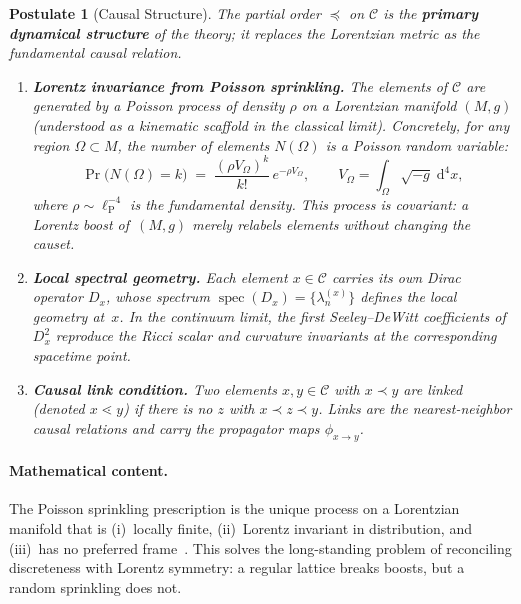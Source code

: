 \documentclass[12pt,a4paper]{article}
\theoremstyle{postulate}
\newtheorem{postulate}{Postulate}
\newcommand{\spec}{\operatorname{spec}}
\newcommand{\Dirac}{D}
\newcommand{\Causal}{\mathcal{C}}
\newcommand{\planck}{\ell_{\mathrm{P}}}
\newcommand{\dd}{\mathrm{d}}
\begin{document}
\begin{postulate}[Causal Structure]\label{post:causality}
The partial order $\preceq$ on $\Causal$ is the \textbf{primary dynamical
structure} of the theory; it replaces the Lorentzian metric as the
fundamental causal relation.

\begin{enumerate}[label=(\alph*)]
  \item \textbf{Lorentz invariance from Poisson sprinkling.}\quad
        The elements of $\Causal$ are generated by a Poisson process of
        density $\rho$ on a Lorentzian manifold $(M, g)$ (understood as
        a kinematic scaffold in the classical limit).  Concretely, for any
        region $\Omega \subset M$, the number of elements $N(\Omega)$ is a
        Poisson random variable:
        \begin{equation}\label{eq:poisson}
          \Pr\bigl(N(\Omega) = k\bigr)
          \;=\; \frac{(\rho V_\Omega)^k}{k!}\,e^{-\rho V_\Omega},
          \qquad
          V_\Omega = \int_\Omega \sqrt{-g}\;\dd^4 x,
        \end{equation}
        where $\rho \sim \planck^{-4}$ is the fundamental density.  This
        process is covariant: a Lorentz boost of~$(M,g)$ merely relabels
        elements without changing the causet.

  \item \textbf{Local spectral geometry.}\quad
        Each element $x \in \Causal$ carries its own Dirac operator
        $\Dirac_x$, whose spectrum $\spec(\Dirac_x) = \{\lambda_n^{(x)}\}$
        defines the local geometry at~$x$.  In the continuum limit, the first
        Seeley--DeWitt coefficients of $\Dirac_x^2$ reproduce the Ricci
        scalar and curvature invariants at the corresponding spacetime point.

  \item \textbf{Causal link condition.}\quad
        Two elements $x, y \in \Causal$ with $x \prec y$ are \emph{linked}
        (denoted $x \lessdot y$) if there is no $z$ with $x \prec z \prec y$.
        Links are the nearest-neighbor causal relations and carry the
        propagator maps $\phi_{x \to y}$.
\end{enumerate}
\end{postulate}

\paragraph{Mathematical content.}
The Poisson sprinkling prescription is the unique process on a Lorentzian
manifold that is (i)~locally finite, (ii)~Lorentz invariant in distribution,
and (iii)~has no preferred frame~\cite{Bombelli2009}.  This solves the
long-standing problem of reconciling discreteness with Lorentz symmetry:
a regular lattice breaks boosts, but a random sprinkling does not.
\end{document}
